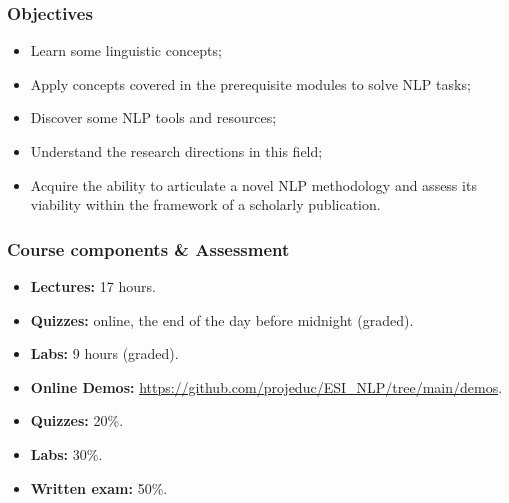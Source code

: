 \documentclass{beamer}
\begin{document}
\begin{frame}
\frametitle{Objectives}

\begin{itemize}
	\item Learn some linguistic concepts;
	\item Apply concepts covered in the prerequisite modules to solve NLP tasks;
	\item Discover some NLP tools and resources;
	\item Understand the research directions in this field;
	\item Acquire the ability to articulate a novel NLP methodology and assess its viability within the framework of a scholarly publication.
\end{itemize}

\end{frame}


\begin{frame}
\frametitle{Course components \& Assessment}

\begin{itemize}
	\item \textbf{Lectures:} 17 hours.
	\item \textbf{Quizzes:} online, the end of the day before midnight (graded).
	\item \textbf{Labs:} 9 hours (graded).
	\item \textbf{Online Demos:} {\scriptsize\url{https://github.com/projeduc/ESI_NLP/tree/main/demos}}.
\end{itemize}

\vfill

\begin{itemize}
	\item \textbf{Quizzes:} 20\%.
	\item \textbf{Labs:} 30\%.
	\item \textbf{Written exam:} 50\%.
\end{itemize}

\end{frame}
\end{document}
